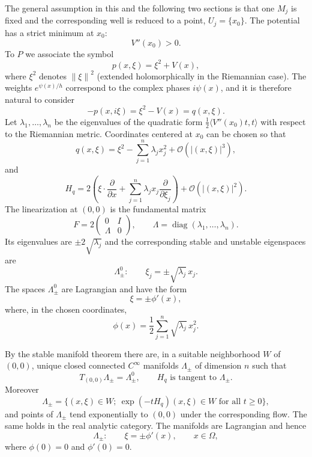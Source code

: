\documentclass[11pt,a4paper]{article}
\newcommand{\cO}{\mathcal O}
\newcommand{\norm}[1]{\left\lVert #1\right\rVert}
\numberwithin{equation}{section}
\theoremstyle{remark}
\begin{document}
The general assumption in this and the following two sections is that one $M_j$ is fixed and the corresponding well is reduced to a point, $U_j=\{x_0\}$. The potential has a strict minimum at $x_0$:
\begin{equation}
V''(x_0)>0.
\end{equation}
To $P$ we associate the symbol
\[
p(x,\xi)=\xi^2+V(x),
\]
where $\xi^2$ denotes $\norm\xi^2$ (extended holomorphically in the Riemannian case). The weights $e^{\psi(x)/h}$ correspond to the complex phases $i\psi(x)$, and it is therefore natural to consider
\[
-p(x,i\xi)=\xi^2-V(x)=q(x,\xi).
\]
Let $\lambda_1,\ldots,\lambda_n$ be the eigenvalues of the quadratic form $\frac12\langle V''(x_0)t,t\rangle$ with respect to the Riemannian metric. Coordinates centered at $x_0$ can be chosen so that
\begin{equation}
q(x,\xi)=\xi^2-\sum_{j=1}^n\lambda_jx_j^2+\cO(|(x,\xi)|^3),
\end{equation}
and
\begin{equation}
H_q=2\left(\xi\cdot\frac\partial{\partial x}+
\sum_{j=1}^n\lambda_jx_j\frac\partial{\partial\xi_j}\right)
+\cO(|(x,\xi)|^2).
\end{equation}
The linearization at $(0,0)$ is the fundamental matrix
\begin{equation}
F=2\begin{pmatrix}0&I\\ \Lambda&0\end{pmatrix},
\qquad \Lambda=\operatorname{diag}(\lambda_1,\ldots,\lambda_n).
\end{equation}
Its eigenvalues are $\pm2\sqrt{\lambda_j}$ and the corresponding stable and unstable eigenspaces are
\begin{equation}
\Lambda_\pm^0:\qquad \xi_j=\pm\sqrt{\lambda_j}\,x_j.
\end{equation}
The spaces $\Lambda_\pm^0$ are Lagrangian and have the form
\begin{equation}
\xi=\pm\phi'(x),
\end{equation}
where, in the chosen coordinates,
\[
\phi(x)=\frac12\sum_{j=1}^n\sqrt{\lambda_j}\,x_j^2.
\]

By the stable manifold theorem there are, in a suitable neighborhood $W$ of $(0,0)$, unique closed connected $C^\infty$ manifolds $\Lambda_\pm$ of dimension $n$ such that
\begin{equation}
T_{(0,0)}\Lambda_\pm=\Lambda_\pm^0,
\qquad H_q\text{ is tangent to }\Lambda_\pm.
\end{equation}
Moreover
\begin{equation}
\Lambda_\pm=\{(x,\xi)\in W;\ \exp(-tH_q)(x,\xi)\in W\text{ for all }t\ge0\},
\end{equation}
and points of $\Lambda_\pm$ tend exponentially to $(0,0)$ under the corresponding flow. The same holds in the real analytic category. The manifolds are Lagrangian and hence
\begin{equation}
\Lambda_\pm:\qquad \xi=\pm\phi'(x),\qquad x\in\Omega,
\end{equation}
where $\phi(0)=0$ and $\phi'(0)=0$.
\end{document}
